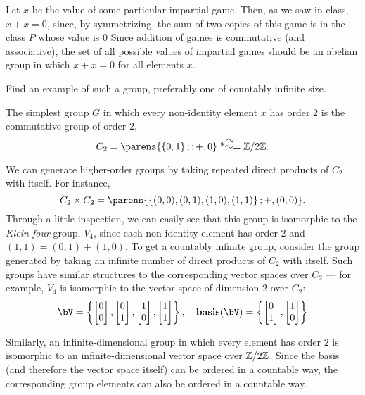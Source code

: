 \documentclass[11pt, reqno]{amsart}
\begin{document}
\begin{problem}[9]
  Let $x$ be the value of some particular impartial game.
  Then, as we saw in class, $x + x = 0$, since, by symmetrizing,
  the sum of two copies of this game is in the class $P$ whose value is $0$
  Since addition of games is commutative (and associative),
  the set of all possible values of impartial games should be an abelian group
  in which $x + x = 0$ for all elements $x$.
  
  Find an example of such a group, preferably one of countably infinite size.
  
  \medskip
  The simplest group $G$ in which every non-identity element $x$ has order $2$
  is the commutative group of order $2$, \[ C_2 = \parens{\set{0,1};; +, 0} \isom \Z/2\Z.\]

  We can generate higher-order groups by taking repeated direct products
  of $C_2$ with itself.
  For instance, \[ C_2 \times C_2 = \parens{\set{(0,0),(0,1),(1,0),(1,1)}; +, (0,0)}. \]
  Through a little inspection, we can easily see that this group is isomorphic
  to the \emph{Klein four} group, $V_4$, since each non-identity element has order
  $2$ and $(1,1) = (0,1) + (1,0)$.
  To get a countably infinite group, consider the group generated by taking
  an infinite number of direct products of $C_2$ with itself.
  Such groups have similar structures to the corresponding vector spaces over $C_2$ ---
  for example, $V_4$ is isomorphic to the vector space of dimension $2$ over $C_2$:
  \begin{align*}
    \bV = \set{
      \begin{bmatrix} 0 \\ 0 \end{bmatrix},
      \begin{bmatrix} 0 \\ 1 \end{bmatrix},
      \begin{bmatrix} 1 \\ 0 \end{bmatrix},
      \begin{bmatrix} 1 \\ 1 \end{bmatrix} },
      \quad
      \mathbf{basis}(\bV) = \set{
        \begin{bmatrix} 0 \\ 1 \end{bmatrix},
        \begin{bmatrix} 1 \\ 0 \end{bmatrix}
      }
  \end{align*}

  Similarly, an infinite-dimensional group in which every element
  has order $2$ is isomorphic to an infinite-dimensional vector space
  over $\mathbb{Z}/2\mathbb{Z}$. Since the basis (and therefore the vector space itself)
  can be ordered in a countable way, the corresponding group elements
  can also be ordered in a countable way.
\end{problem}
\end{document}
